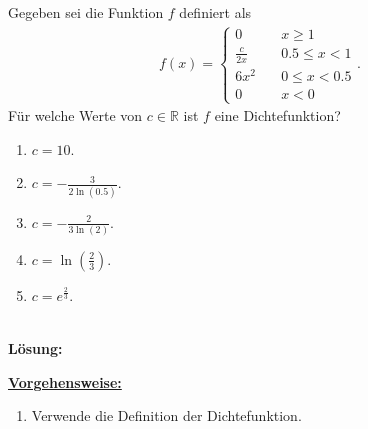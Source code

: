 \subsection*{}
Gegeben sei die Funktion $ f $ definiert als
\begin{align*}
	f(x)
	=
	\begin{cases}
		0 \quad &x \geq 1\\
		\frac{c}{2x} \quad &0.5 \leq x < 1\\
		6x^2 \quad &0 \leq x < 0.5\\
		0 \quad &x<0
	\end{cases}.
\end{align*}
Für welche Werte von $ c \in \mathbb{R} $ ist $ f $ eine Dichtefunktion?
\renewcommand{\labelenumi}{(\alph{enumi})}
\begin{enumerate}
	\item 
	$ c = 10$.
	\item 
	$ c= -\frac{3}{2 \ln(0.5)} $.
	\item
	$ c= -\frac{2}{3 \ln(2)} $.
	\item
	$ c = \ln \left(\frac{2}{3}\right) $.
	\item
	$ c = e^{\frac{2}{3}} $.
\end{enumerate}
\ \\
\textbf{Lösung:}
\begin{mdframed}
	\underline{\textbf{Vorgehensweise:}}
	\renewcommand{\labelenumi}{\theenumi.}
	\begin{enumerate}
		\item Verwende die Definition der Dichtefunktion.
	\end{enumerate}
\end{mdframed}

